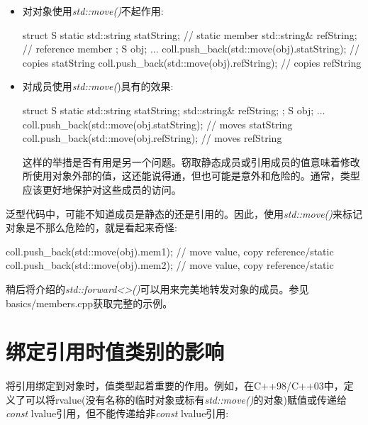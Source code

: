 \begin{itemize}
  \item 对对象使用\textit{std::move()}不起作用:\par
\begin{codebox}[cpp]
  struct S {
    static std::string statString; // static member
    std::string& refString; // reference member
  };
  S obj;
  ...
  coll.push_back(std::move(obj).statString); // copies statString
  coll.push_back(std::move(obj).refString); // copies refString
\end{codebox}
  \item 对成员使用\textit{std::move(})具有的效果:\par
\begin{codebox}[cpp]
  struct S {
    static std::string statString;
    std::string& refString;
  };
  S obj;
  ...
  coll.push_back(std::move(obj.statString); // moves statString
  coll.push_back(std::move(obj.refString); // moves refString
\end{codebox}
  这样的举措是否有用是另一个问题。窃取静态成员或引用成员的值意味着修改所使用对象外部的值，这还能说得通，但也可能是意外和危险的。通常，类型应该更好地保护对这些成员的访问。\par
\end{itemize}

泛型代码中，可能不知道成员是静态的还是引用的。因此，使用\textit{std::move()}来标记对象是不那么危险的，就是看起来奇怪:\par

\begin{codebox}[cpp]
coll.push_back(std::move(obj).mem1); // move value, copy reference/static
coll.push_back(std::move(obj).mem2); // move value, copy reference/static
\end{codebox}

稍后将介绍的\textit{std::\allowbreak{}forward<\allowbreak{}>(\allowbreak{})\allowbreak{}}可以用来完美地转发对象的成员。参见basics/members.cpp获取完整的示例。\par


\section{绑定引用时值类别的影响}

将引用绑定到对象时，值类型起着重要的作用。例如，在C++98/C++03中，定义了可以将rvalue(没有名称的临时对象或标有\textit{std::move()}的对象)赋值或传递给\textit{const} lvalue引用，但不能传递给非\textit{const} lvalue引用:\par

